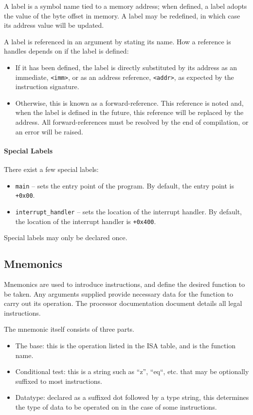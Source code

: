 \documentclass[10pt]{article}
\begin{document}
A label is a symbol name tied to a memory address; when defined, a label adopts the value of the byte offset in memory.
A label may be redefined, in which case its address value will be updated.

A label is referenced in an argument by stating its name.
How a reference is handles depends on if the label is defined:
\begin{itemize}
    \item If it has been defined, the label is directly substituted by its address as an immediate, \texttt{<imm>}, or as an address reference, \texttt{<addr>}, as expected by the instruction signature.
    \item Otherwise, this is known as a forward-reference.
    This reference is noted and, when the label is defined in the future, this reference will be replaced by the address.
    All forward-references must be resolved by the end of compilation, or an error will be raised.
\end{itemize}

\paragraph*{Special Labels}
There exist a few special labels:
\begin{itemize}
    \item \texttt{main} -- sets the entry point of the program.
    By default, the entry point is \texttt{+0x00}.
    \item \texttt{interrupt\_handler} -- sets the location of the interrupt handler.
    By default, the location of the interrupt handler is \texttt{+0x400}.
\end{itemize}

Special labels may only be declared once.

\subsection{Mnemonics}

Mnemonics are used to introduce instructions, and define the desired function to be taken.
Any arguments supplied provide necessary data for the function to carry out its operation.
The processor documentation document details all legal instructions.

The mnemonic itself consists of three parts.
\begin{itemize}
    \item The base: this is the operation listed in the ISA table, and is the function name.
    \item Conditional test: this is a string such as ``z'', ``eq``, etc. that may be optionally suffixed to most instructions.
    \item Datatype: declared as a suffixed dot followed by a type string, this determines the type of data to be operated on in the case of some instructions.
\end{itemize}
\end{document}

